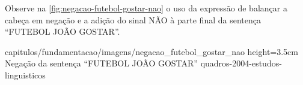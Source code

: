 \begin{enumerate}
          Observe na \autoref{fig:negacao-futebol-gostar-nao} o uso da expressão de balançar a cabeça em negação e a adição do sinal NÃO à parte final da sentença ``FUTEBOL JOÃO GOSTAR''.

          {capitulos/fundamentacao/imagens/negacao_futebol_gostar_nao} %
          {height=3.5cm} %
          {Negação da sentença ``FUTEBOL JOÃO GOSTAR''} %
          {quadros-2004-estudos-linguisticos} %

\end{enumerate}

